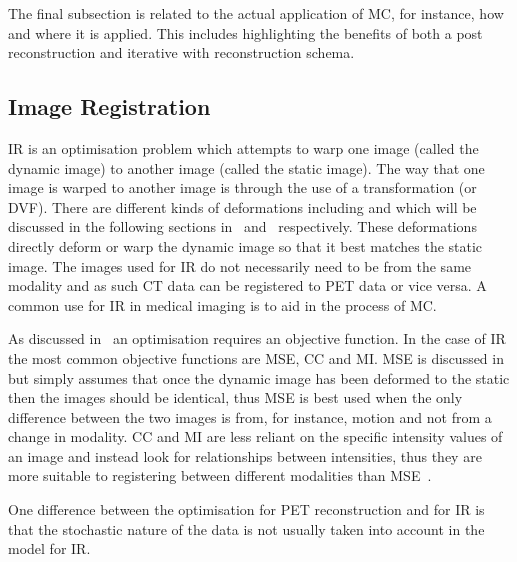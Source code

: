        The final subsection is related to the actual application of \gls{MC}, for instance, how and where it is applied. This includes highlighting the benefits of both a post reconstruction and iterative with reconstruction schema.
    
        \subsection{Image Registration} \label{sec:image_registration}
            \gls{IR} is an optimisation problem which attempts to warp one image (called the dynamic image) to another image (called the static image). The way that one image is warped to another image is through the use of a transformation (or \gls{DVF}). There are  different kinds of deformations including  and  which will be discussed in the following sections in~ and~ respectively. These deformations directly deform or warp the dynamic image so that it best matches the static image. %
            The images used for \gls{IR} do not necessarily need to be from the same modality and as such \gls{CT} data can be registered to \gls{PET} data or vice versa. A common use for \gls{IR} in medical imaging is to aid in the process of \gls{MC}.
            
            As discussed in~ an optimisation requires an objective function. In the case of \gls{IR} the most common objective functions are \gls{MSE}, \gls{CC} and \gls{MI}. \gls{MSE} is discussed in~ but simply assumes that once the dynamic image has been deformed to the static then the images should be identical, thus \gls{MSE} is best used when the only difference between the two images is from, for instance, motion and not from a change in modality. \gls{CC} and \gls{MI} are less reliant on the specific intensity values of an image and instead look for relationships between intensities, thus they are more suitable to registering between different modalities than \gls{MSE}~\parencite{Hill2001, Oliveira2014}.
            
            One difference between the optimisation for \gls{PET} reconstruction and for \gls{IR} is that the stochastic nature of the data is not usually taken into account in the model for \gls{IR}.
            
